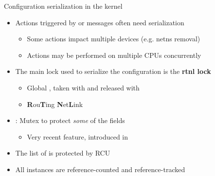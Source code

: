 \begin{frame}{Configuration serialization in the kernel}
	\begin{itemize}
		\item Actions triggered by  or  messages often need serialization
			\begin{itemize}
				\item Some actions impact multiple devices (e.g. netns removal)
				\item Actions may be performed on multiple CPUs concurrently
			\end{itemize}
		\item The main lock used to serialize the configuration is the \textbf{rtnl lock}
			\begin{itemize}
				\item Global , taken with  and released with 
				\item \textbf{R}ou\textbf{T}ing \textbf{N}et\textbf{L}ink
			\end{itemize}
		\item {} : Mutex to protect \textit{some} of the  fields
			\begin{itemize}
				\item Very recent feature, introduced in 
			\end{itemize}
		\item The list of  is protected by RCU
		\item All  instances are reference-counted and reference-tracked
	\end{itemize}
\end{frame}

